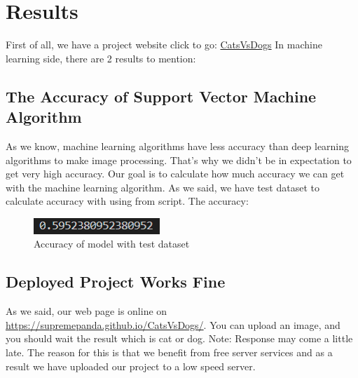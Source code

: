 \documentclass[onecolumn]{article}
\begin{document}
\section{Results}
First of all, we have a project website click to go: \href{https://supremepanda.github.io/CatsVsDogs/}{CatsVsDogs}
\newline
\newline
In machine learning side, there are 2 results to mention:

\subsection{The Accuracy of Support Vector Machine Algorithm}
As we know, machine learning algorithms have less accuracy than deep learning algorithms to make image processing. That's why we didn't be in expectation to get very high accuracy. Our goal is to calculate how much accuracy we can get with the machine learning algorithm. As we said, we have test dataset to calculate accuracy with using  from  script. 
\newline
\newline
The accuracy: 

\begin{figure}[H]
\centering
\includegraphics[]{accuracy.png}
\caption{Accuracy of model with test dataset}
\end{figure}



\subsection{Deployed Project Works Fine}
As we said, our web page is online on \href{https://supremepanda.github.io/CatsVsDogs/}{https://supremepanda.github.io/CatsVsDogs/}. You can upload an image, and you should wait the result which is cat or dog.
\newline
\newline
Note: Response may come a little late. The reason for this is that we benefit from free server services and as a result we have uploaded our project to a low speed server.
\end{document}
